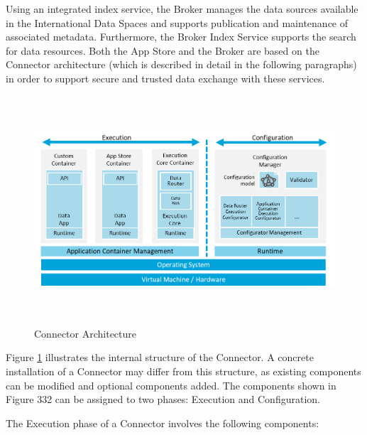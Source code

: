 Using an integrated index service, the Broker manages the data sources available in the International Data Spaces and supports publication and maintenance of associated metadata. Furthermore, the Broker Index Service supports the search for data resources. Both the App Store and the Broker are based on the Connector architecture (which is described in detail in the following paragraphs) in order to support secure and trusted data exchange with these services.




\begin{figure}[H]
	\begin{Center}
		\includegraphics[width=6.37in,height=3.34in]{./media/image55.png}
		\caption{Connector Architecture}
		\label{fig:Connector_Architecture}
	\end{Center}
\end{figure}




Figure \ref{fig:Connector_Architecture} illustrates the internal structure of the Connector. A concrete installation of a Connector may differ from this structure, as existing components can be modified and optional components added. The components shown in Figure 332 can be assigned to two phases: Execution and Configuration.

The Execution phase of a Connector involves the following components:

